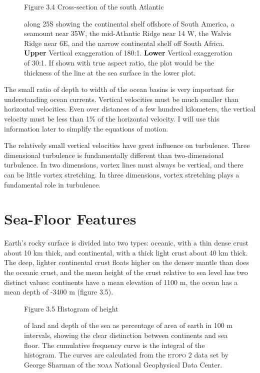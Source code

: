 \begin{figure}[t!]
\footnotesize
Figure 3.4 Cross-section of the south Atlantic\rule{0pt}{3ex} along
25\degrees S showing the continental shelf offshore of South America,
a seamount near 35\degrees W, the mid-Atlantic Ridge near 14\degrees
W, the Walvis Ridge near 6\degrees E, and the narrow continental shelf
off South Africa.  \textbf{Upper} Vertical exaggeration of
180:1. \textbf{Lower} Vertical exaggeration of 30:1. If shown with
true aspect ratio, the plot would be the thickness of the line at the
sea surface in the lower plot.
\label{fig:bathy}
\vspace{-4ex}
\end{figure}

The small ratio of depth to width of the ocean basins is very
important for understanding ocean currents. Vertical velocities must
be much smaller than horizontal velocities. Even over distances of a
few hundred kilometers, the vertical velocity must be less than 1\% of
the horizontal velocity. I will use this information later to simplify
the equations of motion.

The relatively small vertical velocities have great influence on
turbulence. Three dimensional turbulence is
fundamentally different than two-dimensional
turbulence. In two dimensions,
vortex lines must always be vertical, and there can be little vortex
stretching. In three dimensions, vortex stretching plays a fundamental
role in turbulence.

\section{Sea-Floor Features}
Earth's rocky surface is divided into two types: oceanic, with a thin
dense crust about 10 km thick, and continental, with a thick light
crust about 40 km thick. The deep, lighter continental crust floats
higher on the denser mantle than does the oceanic crust, and the mean
height of the crust relative to sea level has two distinct values:
continents have a mean elevation of 1100 m, the ocean has a mean depth
of -3400 m (figure 3.5).

\begin{figure}[t!]
\footnotesize
Figure 3.5 Histogram of height\rule{0pt}{3ex} of land and depth of the
sea as percentage of area of earth in 100 m intervals, showing the
clear distinction between continents and sea floor. The cumulative
frequency curve is the integral of the histogram. The curves are
calculated from the \textsc{etopo} 2 data set by George Sharman of the
\textsc{noaa} National Geophysical Data Center.
\label{fig:depth-r}
\vspace{-3ex}
\end{figure}

